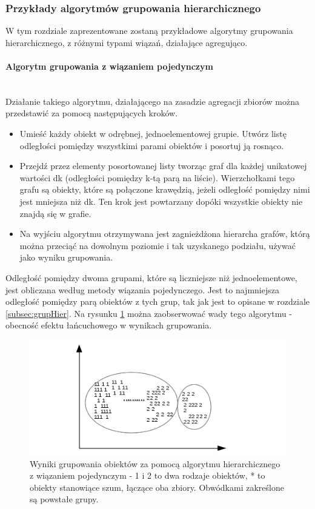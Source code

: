 \documentclass{article}
\newcommand{\myparagraph}[1]{\paragraph{#1}\mbox{}\\}
\begin{document}
\subsubsection{Przykłady algorytmów grupowania hierarchicznego}

W tym rozdziale zaprezentowane zostaną przykładowe algorytmy grupowania hierarchicznego, z różnymi typami wiązań, działające agregująco. 

\myparagraph{Algorytm grupowania z wiązaniem pojedynczym}

Działanie takiego algorytmu, działającego na zasadzie agregacji zbiorów można przedstawić za pomocą następujących kroków.

\begin{itemize}
	\item Umieść każdy obiekt w odrębnej, jednoelementowej grupie. Utwórz listę odległości pomiędzy wszystkimi parami obiektów i posortuj ją rosnąco.
	\item Przejdź przez elementy posortowanej listy tworząc graf dla każdej unikatowej wartości dk (odległości pomiędzy k-tą parą na liście). Wierzchołkami tego grafu są obiekty, które są połączone krawędzią, jeżeli odległość pomiędzy nimi jest mniejsza niż dk. Ten krok jest powtarzany dopóki wszystkie obiekty nie znajdą się w grafie.
	\item Na wyjściu algorytmu otrzymywana jest zagnieżdżona hierarcha grafów, którą można przeciąć na dowolnym poziomie i tak uzyskanego podziału, używać jako wyniku grupowania.
\end{itemize}

Odległość pomiędzy dwoma grupami, które są liczniejsze niż jednoelementowe, jest obliczana według metody wiązania pojedynczego. Jest to najmniejsza odległość pomiędzy parą obiektów z tych grup, tak jak jest to opisane w rozdziale \ref{subsec:grupHier}. Na rysunku \ref{fig:grupHPng} można zaobserwować wady tego algorytmu - obecność efektu łańcuchowego w wynikach grupowania.

\begin{figure}[H]
	\centering
	\includegraphics[scale=0.95]{hierarchiczneGrupowanie.png}
	\caption{Wyniki grupowania obiektów za pomocą algorytmu hierarchicznego z wiązaniem pojedynczym - 1 i 2 to dwa rodzaje obiektów, * to obiekty stanowiące szum, łączące oba zbiory. Obwódkami zakreślone są powstałe grupy.}
	\label{fig:grupHPng}
\end{figure}
\end{document}

